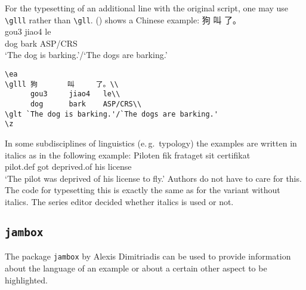 For the typesetting of an additional line with the original script, one may use \verb+\glll+ rather
than \verb+\gll+. () shows a Chinese example:
\ea
\label{ex-chinese}
\glll 狗       叫     了。\\
      gou3     jiao4   le\\
      dog      bark    ASP/CRS\\
\glt `The dog is barking.'/`The dogs are barking.'
\z

\begin{verbatim}
\ea
\glll 狗       叫     了。\\
      gou3     jiao4   le\\
      dog      bark    ASP/CRS\\
\glt `The dog is barking.'/`The dogs are barking.'
\z
\end{verbatim}


In some subdisciplines of linguistics (e.\,g.\ typology) the examples are written in italics as in the
following example:
\ea
\def\exfont{\normalsize\it}
\gll Piloten         fik frataget    sit certifikat\footnotemark\\
     pilot.{\sc def} got deprived.of his license\\
\glt `The pilot was deprived of his license to fly.'
\z 
Authors do not have to care for this. The code for typesetting this is exactly the same as for the
variant without italics.
The series editor decided whether italics is used or not.


\subsection{\texttt{jambox}}
\label{sec-jambox}


The package \texttt{jambox} by Alexis Dimitriadis can be used to provide information about the language of an example or
about a certain other aspect to be highlighted.
\settowidth{}
\eal
{}
\zl

